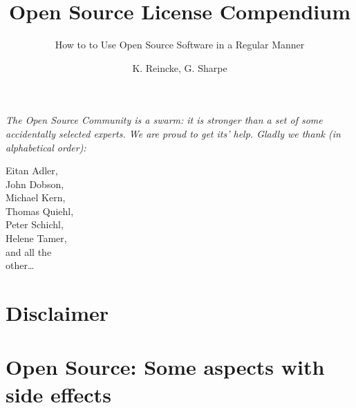 \documentclass[DIV=calc,BCOR=5mm,12pt,headings=small,oneside,toc=bib]{scrbook}
\begin{document}

\titlehead{Release }
\subject{\small \itshape A Practical Guide for Developers, Managers, Companies,
and OS Experts}
\title{Open Source License Compendium}
\subtitle{How to to Use Open Source Software in a Regular Manner}
\author{K. Reincke, G. Sharpe }
\maketitle

\footnotesize
\begin{flushright} 

\parbox{100mm}{\itshape
The Open Source Community is a swarm: it is stronger than a set of some
accidentally selected experts. We are proud to get its' help. Gladly we thank
(in alphabetical order):
}

\parbox{50mm}{
\tiny
\begin{flushright}
Eitan Adler,\\
John Dobson, \\
Michael Kern,\\
Thomas Quiehl,\\
Peter Schichl,\\
Helene Tamer,\\
and all the \\
other\ldots
\end{flushright}
}
\end{flushright}
\normalsize
\newpage

\footnotesize
\tableofcontents
\newpage

\normalsize

\chapter*{Disclaimer}



%




\chapter{Open Source: Some aspects with side effects}\label{sec:SideEffects}






\end{document}
